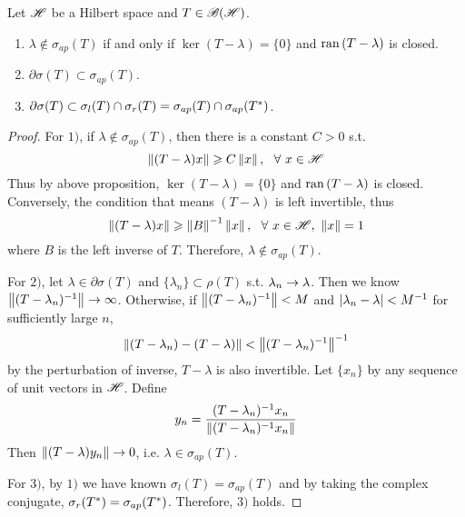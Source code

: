 \documentclass[a4paper,11pt]{report}
\begin{document}
\begin{prop}
	Let $\mathscr{H}$ be a Hilbert space and $T \in \mathscr{B(H)}$.
	\begin{enumerate}
		\item $\lambda \notin \sigma_{ap}(T)$ if and only if $\ker{(T - \lambda)}=\{0\}$ and $\operatorname{ran}{(T - \lambda)}$ is closed.
		\item $\partial \sigma(T) \subset \sigma_{ap}(T)$.
		\item $\partial \sigma(T) \subset \sigma_l(T) \cap \sigma_r(T) = \sigma_{ap}(T) \cap \sigma_{ap}(T^{*})$.
	\end{enumerate}
\end{prop}
\begin{proof}
	For $1)$, if $\lambda \notin \sigma_{ap}(T)$, then there is a constant $C > 0$ s.t.
	\begin{equation*}
		\left\lVert(T-\lambda)x\right\lVert \geqslant C\left\lVert x\right\lVert,~~\forall~x \in \mathscr{H}
	\end{equation*}
	Thus by above proposition, $\ker{(T - \lambda)}=\{0\}$ and $\operatorname{ran}{(T - \lambda)}$ is closed. Conversely, the condition that means $(T-\lambda)$ is left invertible, thus 
	\begin{equation*}
		\left\lVert(T-\lambda)x\right\lVert \geqslant \left\lVert B\right\lVert^{-1}\left\lVert x\right\lVert,~~\forall~ x \in \mathscr{H},~\left\lVert x\right\lVert=1
	\end{equation*}
	where $B$ is the left inverse of $T$. Therefore, $\lambda \notin \sigma_{ap}(T)$.
	\item For $2)$, let $\lambda \in \partial \sigma(T)$ and $\{\lambda_n\} \subset \rho(T)$ s.t. $\lambda_n \rightarrow \lambda$. Then we know $\left\lVert(T-\lambda_n)^{-1}\right\lVert \rightarrow \infty$. Otherwise, if $\left\lVert(T-\lambda_n)^{-1}\right\lVert < M$ and $\left\lvert\lambda_n-\lambda\right\lvert < M^{-1}$ for sufficiently large $n$,
	\begin{equation*}
		\left\lVert(T-\lambda_n)-(T-\lambda)\right\lVert < \left\lVert(T-\lambda_n)^{-1}\right\lVert^{-1}
	\end{equation*}
	by the perturbation of inverse, $T-\lambda$ is also invertible. Let $\{x_n\}$ by any sequence of unit vectors in $\mathscr{H}$. Define
	\begin{equation}
		y_n = \frac{(T-\lambda_n)^{-1}x_n}{\left\lVert(T-\lambda_n)^{-1}x_n\right\lVert}
	\end{equation}
	Then $\left\lVert(T-\lambda)y_n\right\lVert \rightarrow 0$, i.e. $\lambda \in \sigma_{ap}(T)$.
	\item For $3)$, by $1)$ we have known $\sigma_l(T)=\sigma_{ap}(T)$ and by taking the complex conjugate, $\sigma_r(T^{*})=\sigma_{ap}(T^{*})$. Therefore, $3)$ holds.
\end{proof}
\end{document}
